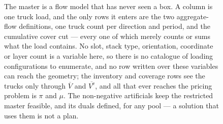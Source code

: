 \begin{figure}[htb]
\caption{The master is a flow model that has never seen a box. A column is
one truck load, and the only rows it enters are the two aggregate-flow
definitions, one truck count per direction and period, and the cumulative
cover cut --- every one of which merely counts or sums what the load
contains. No slot, stack type, orientation, coordinate or layer count is a
variable here, so there is no catalogue of loading configurations to
enumerate, and no row written over these variables can reach the geometry;
the inventory and coverage rows see the trucks only through $\overline{V}$
and $\overline{V^{\mathrm{e}}}$, and all that ever reaches the pricing
problem is $\pi$ and $\mu$. The non-negative artificials keep the restricted
master feasible, and its duals defined, for any pool --- a solution that uses
them is not a plan.}
\label{fig:loop}
\end{figure}
